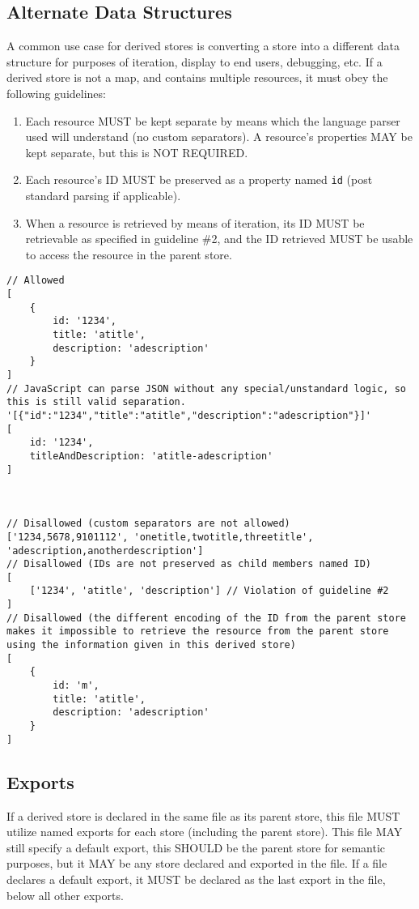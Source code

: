 \documentclass{article}
\begin{document}
\subsection{Alternate Data Structures}
A common use case for derived stores is converting a store into a different data structure for purposes of iteration, display to end users, debugging, etc. If a derived store is not a map, and contains multiple resources, it must obey the following guidelines:
\begin{enumerate}
    \item Each resource MUST be kept separate by means which the language parser used will understand (no custom separators). A resource's properties MAY be kept separate, but this is NOT REQUIRED.
    \item Each resource's ID MUST be preserved as a property named \verb|id| (post standard parsing if applicable).
    \item When a resource is retrieved by means of iteration, its ID MUST be retrievable as specified in guideline \#2, and the ID retrieved MUST be usable to access the resource in the parent store.
\end{enumerate}

\begin{lstlisting}[caption=Derived Store as Array]
// Allowed
[
    {
        id: '1234',
        title: 'atitle',
        description: 'adescription'
    }
]
// JavaScript can parse JSON without any special/unstandard logic, so this is still valid separation.
'[{"id":"1234","title":"atitle","description":"adescription"}]'
[
    id: '1234',
    titleAndDescription: 'atitle-adescription'
]



// Disallowed (custom separators are not allowed)
['1234,5678,9101112', 'onetitle,twotitle,threetitle', 'adescription,anotherdescription']
// Disallowed (IDs are not preserved as child members named ID)
[
    ['1234', 'atitle', 'description'] // Violation of guideline #2
]
// Disallowed (the different encoding of the ID from the parent store makes it impossible to retrieve the resource from the parent store using the information given in this derived store)
[
    {
        id: 'm',
        title: 'atitle',
        description: 'adescription'
    }
]
\end{lstlisting}

\subsection{Exports}
If a derived store is declared in the same file as its parent store, this file MUST utilize named exports for each store (including the parent store). This file MAY still specify a default export, this SHOULD be the parent store for semantic purposes, but it MAY be any store declared and exported in the file. If a file declares a default export, it MUST be declared as the last export in the file, below all other exports.
\end{document}
